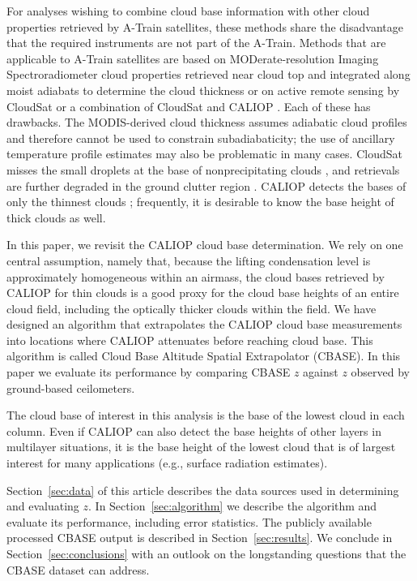 \documentclass[essd,manuscript]{copernicus}\usepackage[]{graphicx}\usepackage[]{color}
\newcommand\CBH{\ensuremath{z}}
\begin{document}
For analyses wishing to combine cloud base information with other cloud
properties retrieved by A-Train satellites, these methods share the
disadvantage that the required instruments are not part of the A-Train.
Methods that are applicable to A-Train satellites are based on
MODerate-resolution Imaging Spectroradiometer \citep[MODIS,][]{Platnick2017}
cloud properties retrieved near cloud top and integrated along moist adiabats
to determine the cloud thickness \citep{Meerkoetter2007,Goren2018} or on active remote
sensing by CloudSat \citep[2B-GEOPROF,][]{Marchand2008} or a combination of
CloudSat and CALIOP \citep[2B-GEOPROF-LIDAR,][]{Mace2014}.  Each of these has
drawbacks.  The MODIS-derived cloud thickness assumes adiabatic cloud profiles
and therefore cannot be used to constrain subadiabaticity; the use of
ancillary temperature profile estimates may also be problematic in many cases.
CloudSat misses the small droplets at the base of nonprecipitating clouds
\citep{Sassen2008}, and retrievals are further degraded in the ground clutter
region \citep{Tanelli2008, Marchand2008}.  CALIOP detects the bases of only
the thinnest clouds \citep[$\tau < 5$,][]{Mace2014}; frequently, it is
desirable to know the base height of thick clouds as well.

In this paper, we revisit the CALIOP cloud base determination.  We rely on
one central assumption, namely that, because the lifting condensation level is
approximately homogeneous within an airmass, the cloud bases retrieved by CALIOP
for thin clouds is a good proxy for the cloud base heights of an entire
cloud field, including the optically thicker clouds within the field.  We have
designed an algorithm that extrapolates the CALIOP cloud base measurements into
locations where CALIOP attenuates before reaching cloud base.  This algorithm is
called Cloud Base Altitude Spatial Extrapolator (CBASE).  In this paper we
evaluate its performance by comparing CBASE \CBH{} against \CBH{} observed by
ground-based ceilometers.

The cloud base of interest in this analysis is the base of the lowest cloud in
each column. Even if CALIOP can also detect the base heights of other layers
in multilayer situations, it is the base height of the lowest cloud that is of
largest interest for many applications (e.g., surface radiation
estimates). 

Section~\ref{sec:data} of this article describes the data sources used in
determining and evaluating \CBH{}.  In Section~\ref{sec:algorithm} we describe
the algorithm and evaluate its performance, including error statistics.  The
publicly available processed CBASE output is described in
Section~\ref{sec:results}.  We conclude in Section~\ref{sec:conclusions} with an
outlook on the longstanding questions that the CBASE dataset can address.
\end{document}

